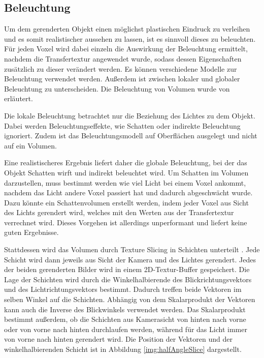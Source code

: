 \subsection{Beleuchtung}
\label{beleuchtung}

Um dem gerenderten Objekt einen möglichst plastischen Eindruck zu verleihen und es somit realistischer aussehen zu lassen, ist es sinnvoll dieses zu beleuchten. 
Für jeden Voxel wird dabei einzeln die Auswirkung der Beleuchtung ermittelt, nachdem die  Transfertextur angewendet wurde, sodass dessen Eigenschaften zusätzlich zu dieser verändert werden. Es können verschiedene Modelle zur Beleuchtung verwendet werden. Außerdem ist zwischen lokaler und globaler Beleuchtung zu unterscheiden. Die Beleuchtung von Volumen wurde von \cite{Fernando04} erläutert.

Die lokale Beleuchtung betrachtet nur die Beziehung des Lichtes zu dem Objekt. Dabei werden Beleuchtungseffekte, wie Schatten oder indirekte Beleuchtung ignoriert. Zudem ist das Beleuchtungsmodell auf Oberflächen ausgelegt und nicht auf ein Volumen. 

Eine realistischeres Ergebnis liefert daher die globale Beleuchtung, bei der das Objekt Schatten wirft und indirekt beleuchtet wird. 
Um Schatten im Volumen darzustellen, muss bestimmt werden wie viel Licht bei einem Voxel ankommt, nachdem das Licht andere Voxel passiert hat und dadurch abgeschwächt wurde. 
Dazu könnte ein Schattenvolumen erstellt werden, indem jeder Voxel aus Sicht des Lichts gerendert wird, welches mit den Werten aus der Transfertextur verrechnet wird. Dieses Vorgehen ist allerdings unperformant und liefert keine guten Ergebnisse.

Stattdessen wird das Volumen durch Texture Slicing in Schichten unterteilt \cite{Hadwiger06}. Jede Schicht wird dann jeweils aus Sicht der Kamera und des Lichtes gerendert. Jedes der beiden gerenderten Bilder wird in einem 2D-Textur-Buffer gespeichert. 
Die Lage der Schichten wird durch die Winkelhalbierende des Blickrichtungsvektors und des Lichtrichtungsvektors bestimmt. Dadurch treffen beide Vektoren im selben Winkel auf die Schichten. Abhängig von dem Skalarprodukt der Vektoren kann auch die Inverse des Blickwinkels verwendet werden. Das Skalarprodukt bestimmt außerdem, ob die Schichten aus Kamerasicht von hinten nach vorne oder von vorne nach hinten durchlaufen werden, während für das Licht immer von vorne nach hinten gerendert wird.
Die Position der Vektoren und der winkelhalbierenden Schicht ist in Abbildung \ref{img:halfAngleSlice} dargestellt.
	
